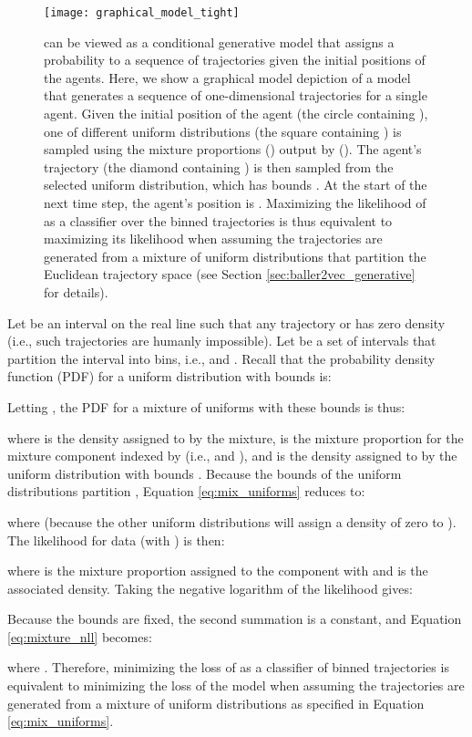 \begin{wrapfigure}{r}{0.5\linewidth}
\vskip -0.2in
\texttt{[image: graphical\_model\_tight]}
\caption{
\btv{} can be viewed as a conditional generative model that assigns a probability to a sequence of trajectories given the initial positions of the agents.
Here, we show a graphical model depiction of a \btv{} model that generates a sequence of one-dimensional trajectories for a single agent.
Given the initial position of the agent (the circle containing ), one of  different uniform distributions (the square containing ) is sampled using the mixture proportions () output by \btv{} ().
The agent's trajectory (the diamond containing ) is then sampled from the selected uniform distribution, which has bounds .
At the start of the next time step, the agent's position is .
Maximizing the likelihood of \btv{} as a classifier over the binned trajectories is thus equivalent to maximizing its likelihood when assuming the trajectories are generated from a mixture of uniform distributions that partition the Euclidean trajectory space (see Section \ref{sec:baller2vec_generative} for details).
}
\label{fig:graphical_model}
\end{wrapfigure}
Let  be an interval on the real line such that any trajectory  or  has zero density (i.e., such trajectories are humanly impossible).
Let  be a set of  intervals that partition the interval  into  bins, i.e.,  and .
Recall that the probability density function (PDF) for a uniform distribution with bounds  is:



\noindent
Letting , the PDF for a mixture of uniforms with these bounds is thus:



\noindent
where  is the density assigned to  by the mixture,  is the mixture proportion for the mixture component indexed by  (i.e.,  and ), and  is the density assigned to  by the uniform distribution with bounds .
Because the bounds of the uniform distributions partition , Equation \eqref{eq:mix_uniforms} reduces to:



\noindent
where  (because the other uniform distributions will assign a density of zero to ).
The likelihood for data  (with ) is then:



\noindent
where  is the mixture proportion assigned to the component with   and  is the associated density.
Taking the negative logarithm of the likelihood gives:



\noindent
Because the bounds are fixed, the second summation is a constant, and Equation \eqref{eq:mixture_nll} becomes:



\noindent
where .
Therefore, minimizing the loss of \btv{} as a classifier of binned trajectories is equivalent to minimizing the loss of the model when assuming the trajectories are generated from a mixture of uniform distributions as specified in Equation \eqref{eq:mix_uniforms}.